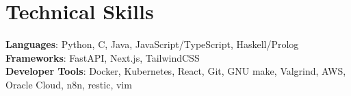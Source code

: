 \documentclass[letterpaper,11pt]{article}
\begin{document}
%
\section{Technical Skills}
 \begin{itemize}[leftmargin=0.15in, label={}]
    \small{\item{
     \textbf{Languages}{: Python, C, Java, JavaScript/TypeScript}, Haskell/Prolog \\
     \textbf{Frameworks}{: FastAPI, Next.js, TailwindCSS} \\
     \textbf{Developer Tools}{: Docker, Kubernetes, React, Git, GNU make, Valgrind, AWS, Oracle Cloud, n8n, restic, vim} \\
    }}
 \end{itemize}


\end{document}
